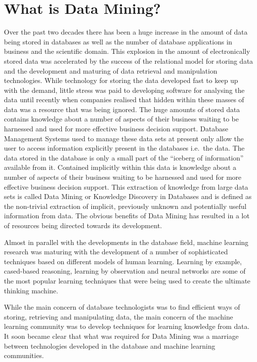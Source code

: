 \documentclass[a4paper,12pt,notitlepage,pdftex]{scrreprt}
\begin{document}
\chapter{What is Data Mining?}
    Over the past two decades there has been a huge increase in the amount of data being stored in databases as well
    as the number of database applications in business and the scientific domain.
    This explosion in the amount of electronically stored data was accelerated by the success of the relational model
    for storing data and the development and maturing of data retrieval and manipulation technologies.
    While technology for storing the data developed fast to keep up with the demand, little stress was paid to
    developing software for analysing the data until recently when companies realised that hidden within these masses
    of data was a resource that was being ignored.
    The huge amounts of stored data contains knowledge about a number of aspects of their business waiting to be
    harnessed and used for more effective business decision support.
    Database Management Systems used to manage these data sets at present only allow the user to access information
    explicitly present in the databases i.e.\ the data.
    The data stored in the database is only a small part of the ``iceberg of information'' available from it.
    Contained implicitly within this data is knowledge about a number of aspects of their business waiting to be
    harnessed and used for more effective business decision support.
    This extraction of knowledge from large data sets is called Data Mining or Knowledge Discovery in Databases and is
    defined as the non-trivial extraction of implicit, previously unknown and potentially useful information from
    data.
    The obvious benefits of Data Mining has resulted in a lot of resources being directed towards its development.

    Almost in parallel with the developments in the database field, machine learning research was maturing with the
    development of a number of sophisticated techniques based on different models of human learning.
    Learning by example, cased-based reasoning, learning by observation and neural networks are some of the most
    popular learning techniques that were being used to create the ultimate thinking machine.

    While the main concern of database technologists was to find efficient ways of storing, retrieving and
    manipulating data, the main concern of the machine learning community was to develop techniques for learning
    knowledge from data.
    It soon became clear that what was required for Data Mining was a marriage between technologies developed in the
    database and machine learning communities.
\end{document}
